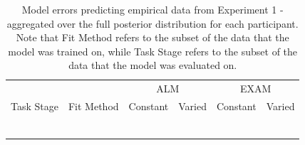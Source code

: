 \documentclass[
  11pt,
  letterpaper,
]{article}
\begin{document}
\begin{longtable}{lcrrrr}

\caption{\label{tbl-htw-modelError-e1}Model errors predicting empirical
data from Experiment 1 - aggregated over the full posterior distribution
for each participant. Note that Fit Method refers to the subset of the
data that the model was trained on, while Task Stage refers to the
subset of the data that the model was evaluated on.}

\tabularnewline

\toprule
 &  & \multicolumn{2}{c}{ALM} & \multicolumn{2}{c}{EXAM} \\ 
\cmidrule(lr){3-4} \cmidrule(lr){5-6}
{Task Stage} & {Fit Method} & Constant & Varied & Constant & Varied \\ 
\midrule\addlinespace[2.5pt]
{\cellcolor[HTML]{FFFFFF}{Test}} & {\cellcolor[HTML]{FFFFFF}{Fit to Test Data}} & {\cellcolor[HTML]{FFFFFF}{199.93}} & {\cellcolor[HTML]{FFFFFF}{103.36}} & {\cellcolor[HTML]{FFFFFF}{104.01}} & {\cellcolor[HTML]{FFFFFF}{85.68}} \\ 
{\cellcolor[HTML]{FFFFFF}{Test}} & {\cellcolor[HTML]{FFFFFF}{Fit to Test \& Training Data}} & {\cellcolor[HTML]{FFFFFF}{216.97}} & {\cellcolor[HTML]{FFFFFF}{170.28}} & {\cellcolor[HTML]{FFFFFF}{127.94}} & {\cellcolor[HTML]{FFFFFF}{144.86}} \\ 
{\cellcolor[HTML]{FFFFFF}{Test}} & {\cellcolor[HTML]{FFFFFF}{Fit to Training Data}} & {\cellcolor[HTML]{FFFFFF}{467.73}} & {\cellcolor[HTML]{FFFFFF}{291.38}} & {\cellcolor[HTML]{FFFFFF}{273.30}} & {\cellcolor[HTML]{FFFFFF}{297.91}} \\ 
{\cellcolor[HTML]{FFFFFF}{Train}} & {\cellcolor[HTML]{FFFFFF}{Fit to Test Data}} & {\cellcolor[HTML]{FFFFFF}{297.82}} & {\cellcolor[HTML]{FFFFFF}{2,016.01}} & {\cellcolor[HTML]{FFFFFF}{53.90}} & {\cellcolor[HTML]{FFFFFF}{184.00}} \\ 
{\cellcolor[HTML]{FFFFFF}{Train}} & {\cellcolor[HTML]{FFFFFF}{Fit to Test \& Training Data}} & {\cellcolor[HTML]{FFFFFF}{57.40}} & {\cellcolor[HTML]{FFFFFF}{132.32}} & {\cellcolor[HTML]{FFFFFF}{42.92}} & {\cellcolor[HTML]{FFFFFF}{127.90}} \\ 
{\cellcolor[HTML]{FFFFFF}{Train}} & {\cellcolor[HTML]{FFFFFF}{Fit to Training Data}} & {\cellcolor[HTML]{FFFFFF}{51.77}} & {\cellcolor[HTML]{FFFFFF}{103.48}} & {\cellcolor[HTML]{FFFFFF}{51.43}} & {\cellcolor[HTML]{FFFFFF}{107.03}} \\ 
\bottomrule

\end{longtable}
\end{document}
